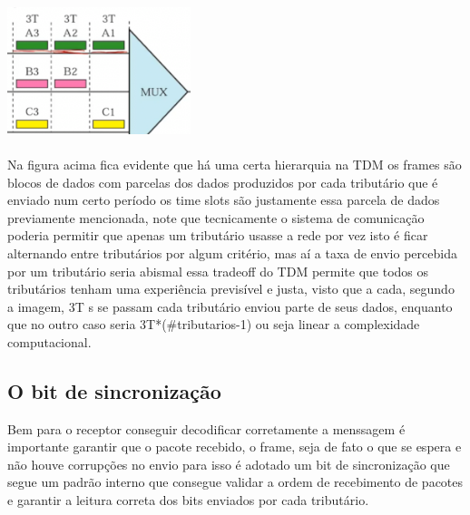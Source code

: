 \includegraphics[width=0.4\textwidth]{../assets/tsl.png}
\\\\
Na figura acima fica evidente que há uma certa hierarquia na TDM os frames são blocos de dados com parcelas dos dados produzidos por cada tributário que é enviado num certo período
os time slots são justamente essa parcela de dados previamente mencionada, note que tecnicamente o sistema de comunicação poderia permitir que apenas um tributário usasse a rede por vez
isto é ficar alternando entre tributários por algum critério, mas aí a taxa de envio percebida por um tributário seria abismal essa tradeoff do TDM permite que todos os tributários tenham uma experiência
previsível e justa, visto que a cada, segundo a imagem, 3T s se passam cada tributário enviou parte de seus dados, enquanto que no outro caso seria 3T*(\#tributarios-1) ou seja
linear a complexidade computacional.

\subsection{O bit de sincronização}

Bem para o receptor conseguir decodificar corretamente a menssagem é importante garantir que o pacote recebido, o frame, seja de fato o que se espera e não houve
corrupções no envio para isso é adotado um bit de sincronização que segue um padrão interno que consegue validar a ordem de recebimento de pacotes e garantir a leitura correta
dos bits enviados por cada tributário.




